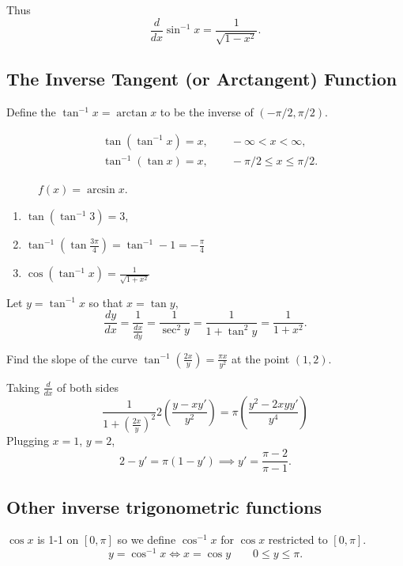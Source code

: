 \documentclass[../calc1-main.tex]{subfiles}
\begin{document}
Thus
\[
  \frac{d }{dx} \sin^{-1} x = \frac{1}{\sqrt{1-x^2}}.
\]

\subsection*{The Inverse Tangent (or Arctangent) Function}

Define the $\tan^{-1} x = \arctan x$ to be the inverse of $(-\pi/2, \pi/2)$.

\begin{align*}
  & \tan (\tan^{-1} x) = x, \qquad -\infty < x < \infty, \\
  & \tan^{-1} (\tan x) = x, \qquad -\pi/2 \le x \le \pi/2.
\end{align*}

\begin{figure}[H]
  \centering
  
  \caption{$f(x) = \arcsin x$.}
\end{figure}

\begin{example}
  \begin{enumerate}
    \item $\tan (\tan^{-1} 3) = 3$,
    \item $\tan^{-1} (\tan \frac{3\pi}{4}) = \tan^{-1} -1 = -\frac{\pi}{4}$
    \item $\cos (\tan^{-1} x) = \frac{1}{\sqrt{1+x^2}}$
  \end{enumerate}
\end{example}

Let $y=\tan^{-1} x$ so that $x = \tan y$,
\[
  \frac{dy}{dx} = \frac{1}{\frac{dx}{dy}} = \frac{1}{\sec^2 y} = \frac{1}{1+ \tan^2 y} = \frac{1}{1+x^2}.
\]

\begin{example}
  Find the slope of the curve $\tan^{-1}\left( \frac{2x}{y} \right) = \frac{\pi x}{y^2}$ at the point $(1, 2)$.
\end{example}
\begin{solution}
  Taking $\frac{d}{dx}$ of both sides
  \[
    \frac{1}{1+\left( \frac{2x}{y} \right)^2} 2\left( \frac{y-x y'}{y^2} \right) = \pi \left( \frac{y^2 - 2x y y'}{y^4} \right)
  \]
  Plugging $x=1$, $y=2$,
  \[
    2- y' = \pi (1- y') \implies y' = \frac{\pi-2}{\pi-1}.
  \]
\end{solution}
\subsection*{Other inverse trigonometric functions}
$\cos x$ is 1-1 on $[0, \pi]$ so we define $\cos^{-1} x$ for $\cos x$ restricted to $[0, \pi]$.
\[
  y = \cos^{-1} x \iff x = \cos y \qquad 0 \le y \le \pi.
\]
\end{document}
